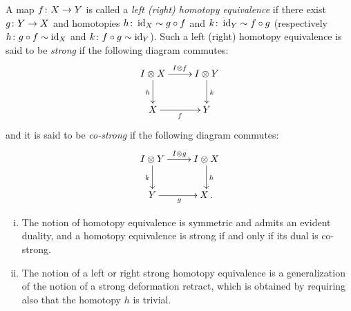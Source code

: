 \documentclass[reqno,10pt,a4paper,oneside]{amsart}
\begin{document}
\begin{definition}
\label{def:homotopy-equivalence}
A map $f \colon X \to Y$ is called a \emph{left (right) homotopy equivalence} if there exist $g \colon Y \to X$ and homotopies $h \colon \operatorname{id}_X \sim g \mathbin{\circ} f$ and $k \colon
\operatorname{id}_Y \sim f \mathbin{\circ} g$ (respectively $h \colon g \mathbin{\circ} f \sim \operatorname{id}_X$ and $k \colon f \mathbin{\circ} g \sim \operatorname{id}_Y$). Such a left (right) homotopy equivalence is said to be \emph{strong} if the
following diagram commutes:
\[
\xymatrix{
\interval \otimes X \ar[r]^{\interval \otimes f } \ar[d]_{h} & \interval \otimes Y \ar[d]^{k} \\
X \ar[r]_{f} & Y}
\]
and it is said to be \emph{co-strong} if  the following diagram commutes:
\[
\xymatrix{
\interval \otimes Y \ar[r]^{\interval \otimes g } \ar[d]_{k} & \interval \otimes X \ar[d]^{h} \\
Y \ar[r]_{g} & X \, .}
\]
%
\end{definition}

\begin{remark} \hfill 
\begin{enumerate}[(i)]
\item  The notion of homotopy equivalence is symmetric and admits an evident duality, and a homotopy equivalence is strong if 
and only if its dual is co-strong. 
\item The notion of a left or right strong homotopy equivalence is a generalization of the notion of a strong deformation retract, which is obtained by requiring also
that the homotopy $h$ is trivial.
\end{enumerate}
\end{remark}
\end{document}

